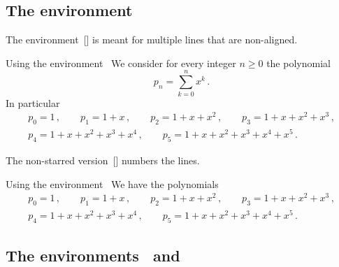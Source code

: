 \subsection{The environment~}

The environment~[\envname] is meant for multiple lines that are non-aligned.
\begin{showlatex}{Using the environment~}
We consider for every integer $n \geq 0$ the polynomial
\[
  p_n
  =
  \sum_{k=0}^n x^k \,.
\]
In particular
\begin{gather*}
  p_0 = 1 \,,
  \qquad
  p_1 = 1 + x \,,
  \qquad
  p_2 = 1 + x + x^2 \,,
  \qquad
  p_3 = 1 + x + x^2 + x^3 \,,
  \\
  p_4 = 1 + x + x^2 + x^3 + x^4 \,,
  \qquad
  p_5 = 1 + x + x^2 + x^3 + x^4 + x^5 \,.
\end{gather*}
\end{showlatex}
The non-starred version~[\envname] numbers the lines.
\begin{showlatex}{Using the environment~}
We have the polynomials
\begin{gather}
  p_0 = 1 \,,
  \qquad
  p_1 = 1 + x \,,
  \qquad
  p_2 = 1 + x + x^2 \,,
  \qquad
  p_3 = 1 + x + x^2 + x^3 \,,
  \\
  p_4 = 1 + x + x^2 + x^3 + x^4 \,,
  \qquad
  p_5 = 1 + x + x^2 + x^3 + x^4 + x^5 \,.
\end{gather}
\end{showlatex}



\subsection{The environments~ and }

